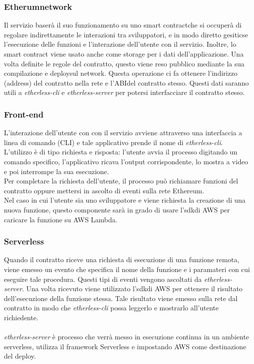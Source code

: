 \subsubsection{Etherum\glo network}
Il servizio baserà il suo funzionamento su uno {smart contract}\glo che si occuperà di regolare indirettamente le interazioni tra sviluppatori, e in modo diretto gesiticse l'esecuzione delle funzioni e l'interazione dell'utente con il servizio. Inoltre, lo smart contract viene usato anche come storage per i dati dell'applicazione. Una volta definite le regole del contratto, questo viene reso pubblico mediante la sua compilazione e deploy\glo sul network\glo. Questa operazione ci fa ottenere l'indirizzo (address) del contratto nella rete e l'ABI\gli del contratto stesso. Questi dati saranno utili a \textit{etherless-cli} e \textit{etherless-server} per potersi interfacciare il contratto stesso.
\subsubsection{Front-end}
L'interazione dell'utente con con il servizio avviene attraverso una interfaccia a linea di comando (CLI\glo) e tale applicativo prende il nome di \textit{etherless-cli}. L'utilizzo è di tipo richiesta e risposta: l'utente avvia il processo digitando un comando specifico, l'applicativo ricava l'output corrispondente, lo mostra a video e poi interrompe la sua esecuzione. \\Per completare la richiesta dell'utente, il processo può richiamare funzioni del contratto oppure mettersi in ascolto di eventi sulla rete Ethereum\glo.
\\Nel caso in cui l'utente sia uno sviluppatore e viene richiesta la creazione di una nuova funzione, questo componente sarà in grado di usare l'sdk\glo di AWS per caricare la funzione su AWS Lambda\glo.
\subsubsection{Serverless}
Quando il contratto riceve una richiesta di esecuzione di una funzione remota, viene emesso un evento che specifica il nome della funzione e i paramateri con cui eseguire tale procedura. Questi tipi di eventi vengono ascoltati da \textit{etherless-server}. Una volta ricevuto viene utilizzato l'sdk\glo di AWS per ottenere il risultato dell'esecuzione della funzione stessa. Tale risultato viene emesso sulla rete dal contratto in modo che \textit{etherless-cli} possa leggerlo e mostrarlo all'utente richiedente.
\\\\
\textit{etherless-server} è processo che verrà messo in esecuzione continua in un ambiente serverless, utilizza il framework Serverless e impostando AWS come destinazione del deploy\glo.

